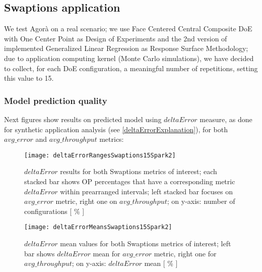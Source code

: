 \subsection{Swaptions application}

We test Agorà on a real scenario; we use Face Centered Central Composite DoE with One Center Point as Design of Experiments and the 2nd version of implemented Generalized Linear Regression as Response Surface Methodology; due to application computing kernel (Monte Carlo simulations), we have decided to collect, for each DoE configuration, a meaningful number of repetitions, setting this value to 15.


\subsubsection{Model prediction quality}

Next figures show results on predicted model using $deltaError$ measure, as done for synthetic application analysis (see \ref{deltaErrorExplanation}), for both $avg\_error$ and $avg\_throughput$ metrics:





\begin{figure}[H]

    \centering
    \texttt{[image: deltaErrorRangesSwaptions15Spark2]}
    \caption[$deltaError$ results for both Swaptions metrics of interest]{$deltaError$ results for both Swaptions metrics of interest; each stacked bar shows OP percentages that have a corresponding metric $deltaError$ within prearranged intervals; left stacked bar focuses on $avg\_error$ metric, right one on $avg\_throughput$; on y-axis: number of configurations [ \% ]}
    \label{fig::swaptions15spark2::intervals}
    
\end{figure}

\begin{figure}[H]

    \centering
    \texttt{[image: deltaErrorMeansSwaptions15Spark2]}
    \caption[$deltaError$ mean values for both Swaptions metrics of interest]{$deltaError$ mean values for both Swaptions metrics of interest; left bar shows $deltaError$ mean for $avg\_error$ metric, right one for $avg\_throughput$; on y-axis: $deltaError$ mean [ \% ]}
    \label{fig::swaptions15spark2::means}
    
\end{figure}





